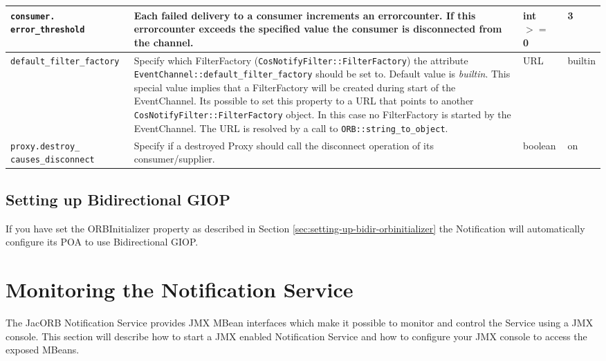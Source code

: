\begin{small}
\begin{longtable}{|p{5cm}|p{7.5cm}|p{1.5cm}|p{1.5cm}|}
    \verb"consumer."
    \verb"error_threshold" &

    Each failed delivery to a consumer increments an errorcounter. If this
    errorcounter exceeds the specified value the consumer is
    disconnected from the channel. &

    int $>=$ 0 & 3 \\ \hline

    \verb"default_filter_factory" &

    Specify which FilterFactory (\texttt{CosNotifyFilter::FilterFactory}) the
    attribute \texttt{EventChannel::\-default\_filter\_factory} should be set to.
    Default value is \emph{builtin}. This special value implies that a
    FilterFactory will be created during start of the EventChannel.
    Its possible to set this property to a URL that points to another
    \texttt{CosNotifyFilter::FilterFactory} object. In this case no FilterFactory
    is started by the EventChannel. The URL is resolved by a call
    to \texttt{ORB::string\_to\_object}. &

    URL & builtin \\ \hline

    \verb"proxy.destroy_"
    \verb"causes_disconnect" &

    Specify if a destroyed Proxy should call the disconnect operation
    of its consumer/supplier. &

    boolean & on \\ \hline
  \end{longtable}
\end{small}

\subsection{Setting up Bidirectional GIOP}

If you have set the ORBInitializer property as described in Section \ref{sec:setting-up-bidir-orbinitializer}
the Notification will automatically configure its POA to use Bidirectional GIOP.

\section{Monitoring the Notification Service}
\label{sec:ntfy-monitoring}

The JacORB Notification Service provides JMX MBean interfaces which make it possible to monitor and control the Service using a JMX console. This section will describe how to start a JMX enabled Notification Service and how to configure your JMX console to access the exposed MBeans.

